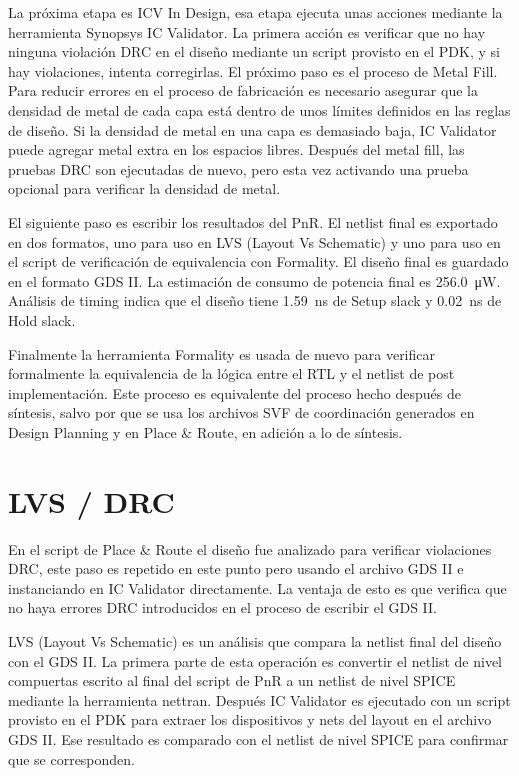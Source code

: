 \documentclass[a4paper, twoside, 11pt]{report}
\begin{document}
La próxima etapa es ICV In Design, esa etapa ejecuta unas acciones mediante la herramienta Synopsys IC Validator. La primera acción es verificar que no hay ninguna violación DRC en el diseño mediante un script provisto en el PDK, y si hay violaciones, intenta corregirlas. El próximo paso es el proceso de Metal Fill. Para reducir errores en el proceso de fabricación es necesario asegurar que la densidad de metal de cada capa está dentro de unos límites definidos en las reglas de diseño. Si la densidad de metal en una capa es demasiado baja, IC Validator puede agregar metal extra en los espacios libres. Después del metal fill, las pruebas DRC son ejecutadas de nuevo, pero esta vez activando una prueba opcional para verificar la densidad de metal.

El siguiente paso es escribir los resultados del PnR. El netlist final es exportado en dos formatos, uno para uso en LVS (Layout Vs Schematic) y uno para uso en el script de verificación de equivalencia con Formality. El diseño final es guardado en el formato GDS II. La estimación de consumo de potencia final es \SI{256.0}{\micro\watt}. Análisis de timing indica que el diseño tiene \SI{1,59}{\nano\second} de Setup slack y \SI{0.02}{\nano\second} de Hold slack.

Finalmente la herramienta Formality es usada de nuevo para verificar formalmente la equivalencia de la lógica entre el RTL y el netlist de post implementación. Este proceso es equivalente del proceso hecho después de síntesis, salvo por que se usa los archivos SVF de coordinación generados en Design Planning y en Place \& Route, en adición a lo de síntesis.

\FloatBarrier
\section{LVS / DRC}

En el script de Place \& Route el diseño fue analizado para verificar violaciones DRC, este paso es repetido en este punto pero usando el archivo GDS II e instanciando en IC Validator directamente. La ventaja de esto es que verifica que no haya errores DRC introducidos en el proceso de escribir el GDS II.

LVS (Layout Vs Schematic) es un análisis que compara la netlist final del diseño con el GDS II. La primera parte de esta operación es convertir el netlist de nivel compuertas escrito al final del script de PnR a un netlist de nivel SPICE mediante la herramienta nettran. Después IC Validator es ejecutado con un script provisto en el PDK para extraer los dispositivos y nets del layout en el archivo GDS II. Ese resultado es comparado con el netlist de nivel SPICE para confirmar que se corresponden.
\end{document}
